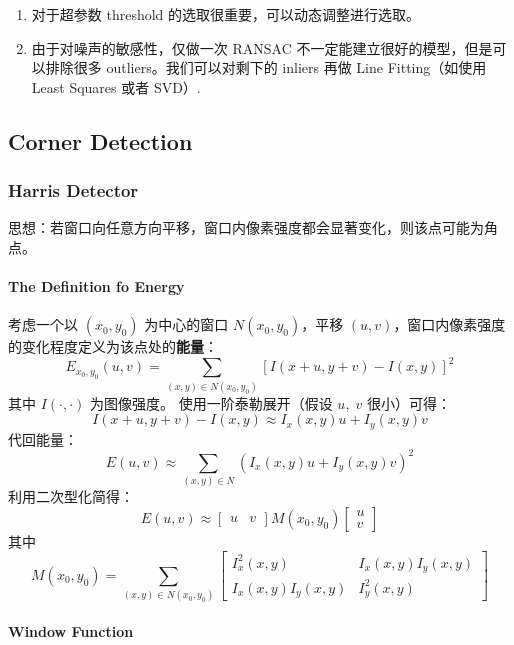 \begin{enumerate}
\def\labelenumi{\arabic{enumi}.}
\tightlist
\item
  对于超参数 threshold 的选取很重要，可以动态调整进行选取。
\item
  由于对噪声的敏感性，仅做一次 RANSAC
  不一定能建立很好的模型，但是可以排除很多 outliers。我们可以对剩下的
  inliers 再做 Line Fitting（如使用 Least Squares 或者 SVD）.
\end{enumerate}

\subsection{Corner Detection}\label{corner-detection}

\subsubsection{Harris Detector}\label{harris-detector}

思想：若窗口向任意方向平移，窗口内像素强度都会显著变化，则该点可能为角点。

\paragraph{The Definition fo Energy}\label{the-definition-fo-energy}

考虑一个以 \((x_0,y_0)\) 为中心的窗口 \(N(x_0,y_0)\)，平移
\((u,v)\)，窗口内像素强度的变化程度定义为该点处的\textbf{能量}： \[
E_{x_0,y_0}(u,v) = \sum_{(x,y)\in N(x_0,y_0)} [I(x+u,y+v) - I(x,y)]^2
\] 其中 \(I(\cdot,\cdot)\) 为图像强度。 使用一阶泰勒展开（假设
\(u, \; v\) 很小）可得： \[
I(x+u,y+v) - I(x,y) \approx I_x(x,y) u + I_y(x,y) v
\] 代回能量： \[
E(u,v) \approx \sum_{(x,y)\in N} (I_x(x,y) u + I_y(x,y) v)^2
\] 利用二次型化简得： \[
E(u,v) \approx \begin{bmatrix} u & v \end{bmatrix}
M(x_0,y_0)
\begin{bmatrix} u \\ v \end{bmatrix}
\] 其中 \[
M(x_0,y_0)
= \sum_{(x,y)\in N(x_0,y_0)} \begin{bmatrix} I_x^2(x,y) & I_x(x,y) I_y(x,y) \\ I_x(x,y) I_y(x,y) & I_y^2(x,y) \end{bmatrix}
\]

\paragraph{Window Function}\label{window-function}

